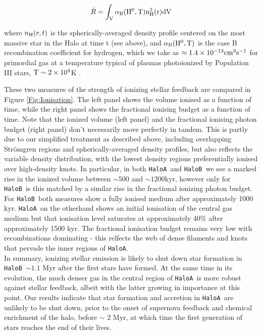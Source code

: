 \documentclass[graphics, twocolumn, usenatbib]{mn2e}
\newcommand{\ha} {\texttt{HaloA~}}
\newcommand{\hb} {\texttt{HaloB~}}
\newcommand{\hac} {\texttt{HaloA}}
\begin{document}
\begin{equation}
    \dot R = \int_{\rm{V}}\alpha_{\rm{B}}(\rm{H}^{0},T)n_{\rm{H}}^{2}(r)d\rm{V}
\end{equation}

\noindent where $n_{\rm{H}}(r, t)$ is the spherically-averaged density profile centered on the most massive star in the Halo at time t (see above), and $\alpha_{\rm{B}}(\rm{H}^{0},T)$ is the case B recombination coefficient for hydrogen, which we take as $\approx1.4\times 10^{-13}\rm{cm}^{3}\rm{s}^{-1}$ for primordial gas at a temperature typical of plasmas photoionized by Population III stars, $\rm{T}\sim 2\times 10^{4}$K \citep{Osterbrock2006, Johnson2012}. 

These two measures of the strength of ionizing stellar feedback are compared in Figure \ref{Fig:Ionisation}. The left panel shows the volume ionised as a function of time, while the right panel shows
the fractional ionising budget as a function of time. Note that the ionized volume (left panel) and the fractional ionising photon budget (right panel) don't necessarily
move perfectly in tandem. This is partly due to our simplified treatment as described above, including overlapping Str{\" o}mgren regions and spherically-averaged density profiles, but also
reflects the variable density distribution, with the lowest density regions preferentially ionised over high-density knots. In particular, in both \ha and \hb we see a marked rise in the
ionized volume between $\sim 500$ and $\sim1200$kyr, however only for \hb is this matched by a similar rise in the fractional ionizing photon budget. For \hb both measures show a fully ionised medium
after approximately 1000 kyr. \ha on the otherhand shows an initial ionisation of the central gas medium but that ionisation level saturates at approximately 40\% after approximately 1500 kyr. The fractional
ionisation budget remains very low with recombinations dominating - this relfects the web of dense filaments and knots that pervade the inner regions of \hac. \\
\indent In summary, ionizing stellar emission is likely to shut down star formation in \hb $\sim 1.1$ Myr after the first stars have formed. At the same time in its evolution, the much denser gas in the central region of \ha is more robust against stellar feedback, albeit with the latter growing in importance at this point. Our results indicate that star formation and accretion in \ha are unlikely to be shut down, prior to the onset of supernova feedback and chemical enrichment of the halo, before $\sim$ 2 Myr, at which time the first generation of stars reaches the end of their lives. 
\end{document}
